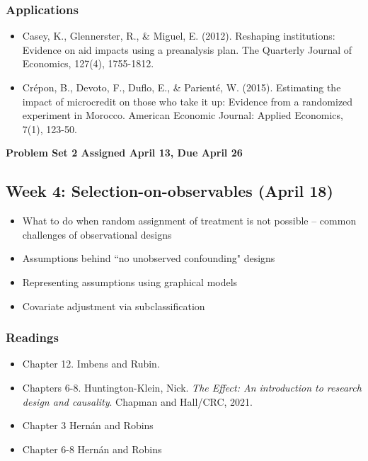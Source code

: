 \documentclass[11pt, article, oneside]{memoir}
\theoremstyle{Assumption}
\begin{document}
\subsubsection*{Applications}

\begin{itemize}
\item Casey, K., Glennerster, R., \& Miguel, E. (2012). Reshaping institutions: Evidence on aid impacts using a preanalysis plan. The Quarterly Journal of Economics, 127(4), 1755-1812.
\item Crépon, B., Devoto, F., Duflo, E., \& Parienté, W. (2015). Estimating the impact of microcredit on those who take it up: Evidence from a randomized experiment in Morocco. American Economic Journal: Applied Economics, 7(1), 123-50.
\end{itemize}


\textbf{Problem Set 2 Assigned April 13, Due April 26}

\subsection{Week 4: Selection-on-observables (April 18)}

\begin{itemize}
\item What to do when random assignment of treatment is not possible -- common challenges of observational designs
\item Assumptions behind ``no unobserved confounding" designs
\item Representing assumptions using graphical models
\item Covariate adjustment via subclassification
\end{itemize}

\subsubsection*{Readings}

\begin{itemize}
\item Chapter 12. Imbens and Rubin.
\item Chapters 6-8. Huntington-Klein, Nick. \emph{The Effect: An introduction to research design and causality}. Chapman and Hall/CRC, 2021.
\item Chapter 3 Hern\'an and  Robins
\item Chapter 6-8 Hern\'an and  Robins
\end{itemize}
\end{document}
